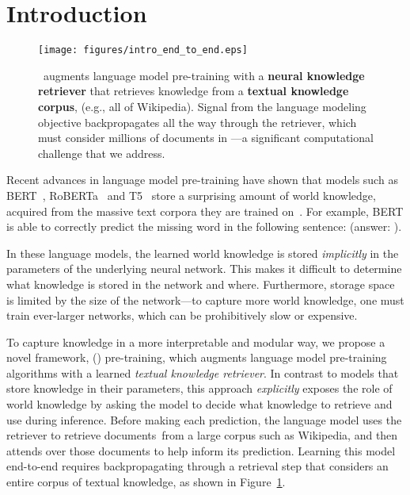 \documentclass{article}
\begin{document}
\section{Introduction}

\begin{figure}[t]
\centering
\texttt{[image: figures/intro\_end\_to\_end.eps]}
\caption{\label{fig:intro} \ \thename augments language model pre-training with a {\bf neural knowledge retriever}
that retrieves knowledge from a {\bf textual knowledge corpus},  (e.g., all of Wikipedia). Signal from the language modeling objective backpropagates all the way through the retriever, which must consider millions of documents in ---a significant computational challenge that we address.}
\end{figure}

Recent advances in language model pre-training have shown that models such as BERT~\cite{bert}, RoBERTa~\cite{roberta} and T5~\cite{t5} store a surprising amount of world knowledge,
acquired from the massive text corpora they are trained on~\cite{lm_as_kb}.
For example, BERT is able to correctly predict the missing word in the following sentence:
\nl{The \blank\xspace is the currency of the United Kingdom} (answer: ).

In these language models, the learned world knowledge is stored {\em implicitly} in the parameters of the underlying neural network. This makes it difficult to determine what knowledge is stored in the network and where.
Furthermore, storage space is limited by the size of the network---to capture more world knowledge, one must train ever-larger networks, which can be prohibitively slow or expensive. 

To capture knowledge in a more interpretable and modular way, we propose a novel framework, \thefullname (\thename) pre-training, which augments language model pre-training algorithms with a learned {\em textual knowledge retriever}.
In contrast to models that store knowledge in their parameters, this approach \emph{explicitly} exposes the role of world knowledge by asking the model to decide what knowledge to retrieve and use during inference.
Before making each prediction, the language model uses the retriever to retrieve documents\footnotemark~from a large corpus such as Wikipedia,
and then attends over those documents to help inform its prediction.
Learning this model end-to-end requires backpropagating through a retrieval step that considers an entire corpus of textual knowledge, as shown in Figure~\ref{fig:intro}.
\end{document}
